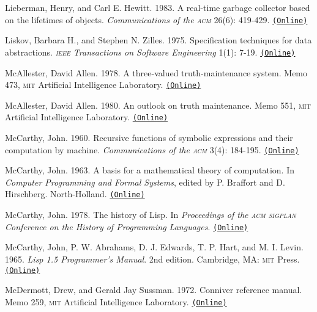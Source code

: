 \documentclass[oneside]{book}
\newcommand{\acronym}[1]{\textsc{\MakeLowercase{#1}}}
\newcommand{\code}[1]{\texttt{#1}}
\begin{document}
 \label{Lieberman and Hewitt 1983}
Lieberman, Henry, and Carl E. Hewitt. 1983. A real-time garbage collector based
on the lifetimes of objects. \textit{Communications of the \acronym{ACM}}
26(6): 419-429.
\href{http://dspace.mit.edu/handle/1721.1/6335}{\code{(Online)}}

 \label{Liskov and Zilles (1975)}
Liskov, Barbara H., and Stephen N. Zilles.  1975.  Specification techniques for
data abstractions.  \textit{\acronym{IEEE} Transactions on Software Engineering}
1(1): 7-19.
\href{http://csg.csail.mit.edu/CSGArchives/memos/Memo-117.pdf}{\code{(Online)}}

 \label{McAllester (1978; 1980)}
McAllester, David Allen.  1978.  A three-valued truth-maintenance system.  Memo
473, \acronym{MIT} Artificial Intelligence Laboratory.
\href{http://dspace.mit.edu/handle/1721.1/6296}{\code{(Online)}}

McAllester, David Allen.  1980.  An outlook on truth maintenance.  Memo 551,
\acronym{MIT} Artificial Intelligence Laboratory.
\href{http://dspace.mit.edu/handle/1721.1/6327}{\code{(Online)}}

 \label{McCarthy 1960}
McCarthy, John.  1960.  Recursive functions of symbolic expressions and their
computation by machine.  \textit{Communications of the \acronym{ACM}}
3(4): 184-195.
\href{http://innovation.it.uts.edu.au/projectjmc/articles/recursive.html}{\code{(Online)}}

 \label{McCarthy 1963}
McCarthy, John.  1963.  A basis for a mathematical theory of computation.  In
\textit{Computer Programming and Formal Systems}, edited by P. Braffort and
D. Hirschberg.  North-Holland.
\href{http://innovation.it.uts.edu.au/projectjmc/articles/basis.html}{\code{(Online)}}

 \label{McCarthy 1978}
McCarthy, John.  1978.  The history of Lisp.  In \textit{Proceedings of the
\acronym{ACM} \acronym{SIGPLAN} Conference on the History of Programming
Languages}.
\href{http://innovation.it.uts.edu.au/projectjmc/articles/lisp.html}{\code{(Online)}}

 \label{McCarthy et al. 1965}
McCarthy, John, P. W. Abrahams, D. J. Edwards, T. P. Hart, and M. I.  Levin.
1965.  \textit{Lisp 1.5 Programmer's Manual}.  2nd edition.  Cambridge, MA:
\acronym{MIT} Press.
\href{http://www.softwarepreservation.org/projects/LISP/book/LISP\%201.5\%20Programmers\%20Manual.pdf/view}{\code{(Online)}}

 \label{McDermott and Sussman (1972)}
McDermott, Drew, and Gerald Jay Sussman.  1972. Conniver reference manual.
Memo 259, \acronym{MIT} Artificial Intelligence Laboratory.
\href{http://dspace.mit.edu/handle/1721.1/6203}{\code{(Online)}}
\end{document}
